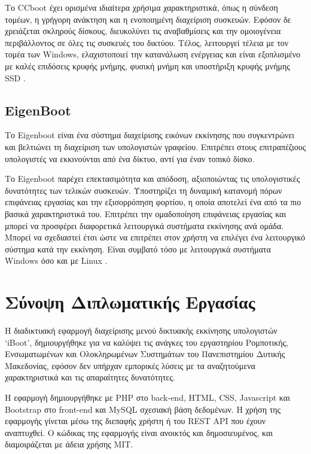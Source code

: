 Το CCboot έχει ορισμένα ιδιαίτερα χρήσιμα χαρακτηριστικά, όπως η σύνδεση τομέων, η γρήγορη ανάκτηση και η ενοποιημένη διαχείριση συσκευών. Εφόσον δε χρειάζεται σκληρούς δίσκους, διευκολύνει τις αναβαθμίσεις και την ομοιογένεια περιβάλλοντος σε όλες τις συσκευές του δικτύου. Τέλος, λειτουργεί τέλεια με τον τομέα των Windows, ελαχιστοποιεί την κατανάλωση ενέργειας και είναι εξοπλισμένο με καλές επιδόσεις κρυφής μνήμης, φυσική μνήμη και υποστήριξη κρυφής μνήμης SSD \cite{CCboot_2022}.

\subsection{EigenBoot}
Το Eigenboot είναι ένα σύστημα διαχείρισης εικόνων εκκίνησης που συγκεντρώνει και βελτιώνει τη διαχείριση των υπολογιστών γραφείου. Επιτρέπει στους επιτραπέζιους υπολογιστές να εκκινούνται από ένα δίκτυο, αντί για έναν τοπικό δίσκο.

Το Eigenboot παρέχει επεκτασιμότητα και απόδοση, αξιοποιώντας τις υπολογιστικές δυνατότητες των τελικών συσκευών. Υποστηρίζει τη δυναμική κατανομή πόρων επιφάνειας εργασίας και την εξισορρόπηση φορτίου, η οποία αποτελεί ένα από τα πιο βασικά χαρακτηριστικά του. Επιτρέπει την ομαδοποίηση επιφάνειας εργασίας και μπορεί να προσφέρει διαφορετικά λειτουργικά συστήματα εκκίνησης ανά ομάδα. Μπορεί να σχεδιαστεί έτσι ώστε να επιτρέπει στον χρήστη να επιλέγει ένα λειτουργικό σύστημα κατά την εκκίνηση. Είναι συμβατό τόσο με λειτουργικά συστήματα Windows όσο και με Linux \cite{EigenBoot_2023}.

\section{Σύνοψη Διπλωματικής Εργασίας}
Η διαδικτυακή εφαρμογή διαχείρισης μενού δικτυακής εκκίνησης υπολογιστών `iBoot', δημιουργήθηκε για να καλύψει τις ανάγκες του εργαστηρίου Ρομποτικής, Ενσωματωμένων και Ολοκληρωμένων Συστημάτων του Πανεπιστημίου Δυτικής Μακεδονίας, εφόσον δεν υπήρχαν εμπορικές λύσεις με τα αναζητούμενα χαρακτηριστικά και τις απαραίτητες δυνατότητες.

Η εφαρμογή δημιουργήθηκε με PHP στο back-end, HTML, CSS, Javascript και Bootstrap στο front-end και MySQL σχεσιακή βάση δεδομένων. Η χρήση της εφαρμογής γίνεται μέσω της διεπαφής χρήστη ή του REST API που έχουν αναπτυχθεί. Ο κώδικας της εφαρμογής είναι ανοικτός και δημοσιευμένος, και διαμοιράζεται με άδεια χρήσης MIT.

